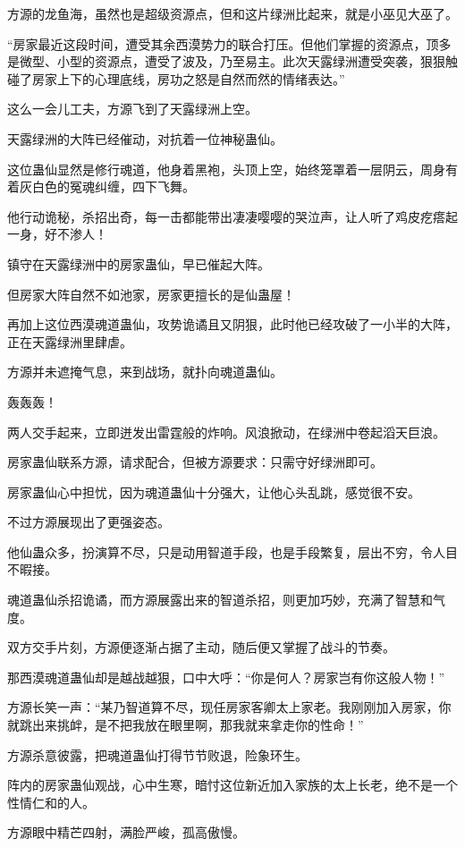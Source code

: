 \begin{this_body}
方源的龙鱼海，虽然也是超级资源点，但和这片绿洲比起来，就是小巫见大巫了。

“房家最近这段时间，遭受其余西漠势力的联合打压。但他们掌握的资源点，顶多是微型、小型的资源点，遭受了波及，乃至易主。此次天露绿洲遭受突袭，狠狠触碰了房家上下的心理底线，房功之怒是自然而然的情绪表达。”

这么一会儿工夫，方源飞到了天露绿洲上空。

天露绿洲的大阵已经催动，对抗着一位神秘蛊仙。

这位蛊仙显然是修行魂道，他身着黑袍，头顶上空，始终笼罩着一层阴云，周身有着灰白色的冤魂纠缠，四下飞舞。

他行动诡秘，杀招出奇，每一击都能带出凄凄嘤嘤的哭泣声，让人听了鸡皮疙瘩起一身，好不渗人！

镇守在天露绿洲中的房家蛊仙，早已催起大阵。

但房家大阵自然不如池家，房家更擅长的是仙蛊屋！

再加上这位西漠魂道蛊仙，攻势诡谲且又阴狠，此时他已经攻破了一小半的大阵，正在天露绿洲里肆虐。

方源并未遮掩气息，来到战场，就扑向魂道蛊仙。

轰轰轰！

两人交手起来，立即迸发出雷霆般的炸响。风浪掀动，在绿洲中卷起滔天巨浪。

房家蛊仙联系方源，请求配合，但被方源要求：只需守好绿洲即可。

房家蛊仙心中担忧，因为魂道蛊仙十分强大，让他心头乱跳，感觉很不安。

不过方源展现出了更强姿态。

他仙蛊众多，扮演算不尽，只是动用智道手段，也是手段繁复，层出不穷，令人目不暇接。

魂道蛊仙杀招诡谲，而方源展露出来的智道杀招，则更加巧妙，充满了智慧和气度。

双方交手片刻，方源便逐渐占据了主动，随后便又掌握了战斗的节奏。

那西漠魂道蛊仙却是越战越狠，口中大呼：“你是何人？房家岂有你这般人物！”

方源长笑一声：“某乃智道算不尽，现任房家客卿太上家老。我刚刚加入房家，你就跳出来挑衅，是不把我放在眼里啊，那我就来拿走你的性命！”

方源杀意彼露，把魂道蛊仙打得节节败退，险象环生。

阵内的房家蛊仙观战，心中生寒，暗忖这位新近加入家族的太上长老，绝不是一个性情仁和的人。

方源眼中精芒四射，满脸严峻，孤高傲慢。


\end{this_body}
